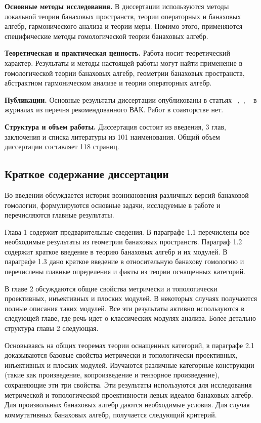 \textbf{Основные методы исследования.} В диссертации используются методы
локальной теории банаховых пространств, теории операторных и банаховых алгебр,
гармонического анализа и теории меры. Помимо этого, применяются специфические
методы гомологической теории банаховых алгебр.

\textbf{Теоретическая и практическая ценность.} Работа носит теоретический
характер. Результаты и методы настоящей работы могут найти применение в
гомологической теории банаховых алгебр, геометрии банаховых пространств,
абстрактном гармоническом анализе и теории операторных алгебр.

\textbf{Публикации.} Основные результаты диссертации опубликованы в статьях
~\cite{NemMetTopProjIdBanAlg},~\cite{NemTopInjCStarAlg},
~\cite{NemHomolTrivCatModLp} в журналах из перечня рекомендованного ВАК. Работ в
соавторстве нет.

\textbf{Структура и объем работы.} Диссертация состоит из введения, 3 глав,
заключения и списка литературы из 101 наименования. Общий объем диссертации
составляет 118 страниц.

\subsection*{\Large Краткое содержание диссертации}
Во введении обсуждается история возникновения различных версий банаховой
гомологии, формулируются основные задачи, исследуемые в работе и перечисляются
главные результаты.

Глава 1 содержит предварительные сведения. В параграфе 1.1 перечислены все
необходимые результаты из геометрии банаховых пространств. Параграф 1.2 содержит
краткое введение в теорию банаховых алгебр и их модулей. В параграфе 1.3 дано
краткое введение в относительную банахову гомологию и перечислены главные
определения и факты из теории оснащенных категорий.

В главе 2 обсуждаются общие свойства метрически и топологически проективных,
инъективных и плоских модулей. В некоторых случаях получаются полные описания
таких модулей. Все эти результаты активно используются в следующей главе, где
речь идет о классических модулях анализа. Более детально структура главы 2
следующая.

Основываясь на общих теоремах теории оснащенных категорий, в параграфе 2.1
доказываются базовые свойства метрически и топологически проективных,
инъективных и плоских модулей. Изучаются различные категорные конструкции (такие
как произведение, копроизведение и тензорное произведение), сохраняющие эти три
свойства. Эти результаты используются для исследования метрической и
топологической проективности левых идеалов банаховых алгебр. Для произвольных
банаховых алгебр даются необходимые условия. Для случая коммутативных банаховых
алгебр, получается следующий критерий.

